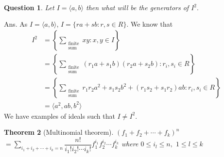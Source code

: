 \documentclass[11pt]{amsart}
\newtheorem{theorem}{Theorem}[section]
\newtheorem{qns}[theorem]{Question}
\newcommand{\gen}[1]{\langle#1\rangle}
\begin{document}
\begin{center}
\end{center}
\begin{qns}
Let $I=\gen{a,b}$ then what will be the generators of $I^2.$ 
\end{qns}
Ans. As $I=\gen{a,b}$, $I=\{ra+sb:r,s\in R\}.$ We know that \begin{align*}
I^2&=\left\lbrace \displaystyle\sum_{\substack{\text{finite}\\ \text{sum}}} xy:x,y\in I \right\rbrace \\
&=\left\lbrace \displaystyle\sum_{\substack{\text{finite}\\ \text{sum}}} (r_1a+s_1b)(r_2a+s_2b):r_i,s_i\in R\right\rbrace \\
&=\left\lbrace \displaystyle\sum_{\substack{\text{finite}\\ \text{sum}}} r_1r_2a^2+s_1s_2b^2+(r_1s_2+s_1r_2)ab:r_i,s_i\in R \right\rbrace\\
&=\gen{a^2,ab,b^2}
\end{align*} 
We have examples of ideals such that $I\neq I^2.$
\begin{theorem}[Multinomial theorem]
$(f_{1}+f_{2}+\cdots +f_{k})^{n}$ $={\displaystyle\sum_{i_{1}+i_{2}+\cdots +i_{k}=n} \dfrac{n!}{i_{1}!i_{2}!\cdots i_{k}!} f_{1}^{i_{1}}f_{2}^{i_{2}}\cdots f_{k}^{i_{k}}}$ where $0\leq i_{l}\leq n,$ $1\leq l\leq k$
\end{theorem}
\end{document}
